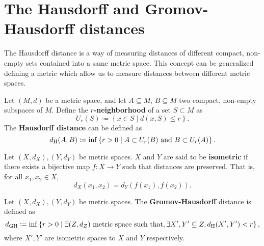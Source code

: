 \section{The Hausdorff and Gromov-Hausdorff distances} \label{sec:preliminaries-hausdorff}

The Hausdorff distance is a way of measuring distances of different compact, non-empty sets contained into a same metric space. This concept can be generalized defining a metric which allow us to measure distances between different metric spaces.

\begin{definition} \label{def:hausdorff-distance}
    Let $ (M, d) $ be a metric space, and let $ A \subseteq M $, $ B \subseteq M $ two compact, non-empty subspaces of $ M $. Define the {\bf $r$-neighborhood} of a set $ S \subset M $ as
    \begin{equation}
        U_r(S) \coloneq \left\{ x \in S \mid d(x, S) \leq r \right\}.
    \end{equation}
    The {\bf Hausdorff distance} can be defined as
    \begin{equation}
        d_{\operatorname{H}}(A, B) \coloneq \inf \left\{ r > 0 \mid A \subset U_r(B) \text{ and } B \subset U_r(A) \right\}.
    \end{equation}
\end{definition}

\begin{definition}
    Let $ (X, d_X), (Y, d_Y) $ be metric spaces. $ X $ and $ Y $ are said to be {\bf isometric} if there exists a bijective map $ f: X \to Y $ such that distances are preserved. That is, for all $ x_1, x_2 \in X $,
    $$
        d_X(x_1, x_2) = d_Y(f(x_1), f(x_2)).
    $$
\end{definition}

\begin{definition} \label{def:dgh}
    Let $ (X, d_X), (Y, d_Y) $ be metric spaces. The {\bf Gromov-Hausdorff} distance is defined as
    \begin{equation}
        d_{\operatorname{GH}} \coloneq \inf \left\{ r > 0 \mid \exists (Z, d_Z) \text{ metric space such that}, \exists X', Y' \subseteq Z, d_{\operatorname{H}}(X', Y') < r \right\},
    \end{equation}
    where $ X', Y' $ are isometric spaces to $ X $ and $ Y $ respectively.
\end{definition}

